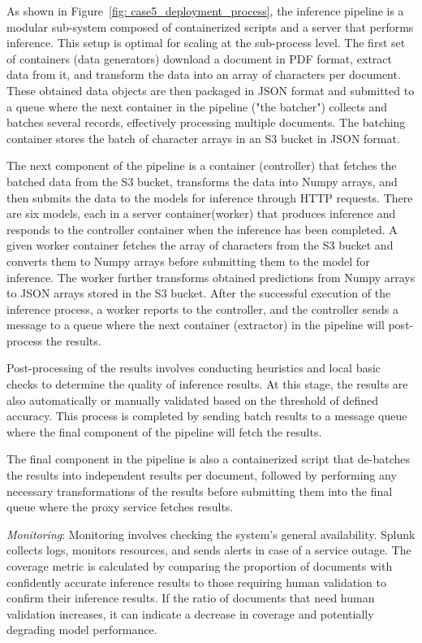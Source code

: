 As shown in Figure~\ref{fig: case5_deployment_process}, the inference pipeline is a modular sub-system composed of containerized scripts and a server that performs inference. This setup is optimal for scaling at the sub-process level. The first set of containers (data generators) download a document in PDF format, extract data from it, and transform the data into an array of characters per document. These obtained data objects are then packaged in JSON format and submitted to a queue where the next container in the pipeline ("the batcher") collects and batches several records, effectively processing multiple documents. The batching container stores the batch of character arrays in an S3 bucket in JSON format. 

The next component of the pipeline is a container (controller) that fetches the batched data from the S3 bucket, transforms the data into Numpy arrays, and then submits the data to the models for inference through HTTP requests. There are six models, each in a server container(worker) that produces inference and responds to the controller container when the inference has been completed. A given worker container fetches the array of characters from the S3 bucket and converts them to Numpy arrays before submitting them to the model for inference. The worker further transforms obtained predictions from Numpy arrays to JSON arrays stored in the S3 bucket. After the successful execution of the inference process, a worker reports to the controller, and the controller sends a message to a queue where the next container (extractor) in the pipeline will post-process the results.

Post-processing of the results involves conducting heuristics and local basic checks to determine the quality of inference results. At this stage, the results are also automatically or manually validated based on the threshold of defined accuracy. This process is completed by sending batch results to a message queue where the final component of the pipeline will fetch the results. %

The final component in the pipeline is also a containerized script that de-batches the results into independent results per document, followed by performing any necessary transformations of the results before submitting them into the final queue where the proxy service fetches results.

\textit{Monitoring}: Monitoring involves checking the system's general availability. Splunk collects logs, monitors resources, and sends alerts in case of a service outage. The coverage metric is calculated by comparing the proportion of documents with confidently accurate inference results to those requiring human validation to confirm their inference results. If the ratio of documents that need human validation increases, it can indicate a decrease in coverage and potentially degrading model performance.